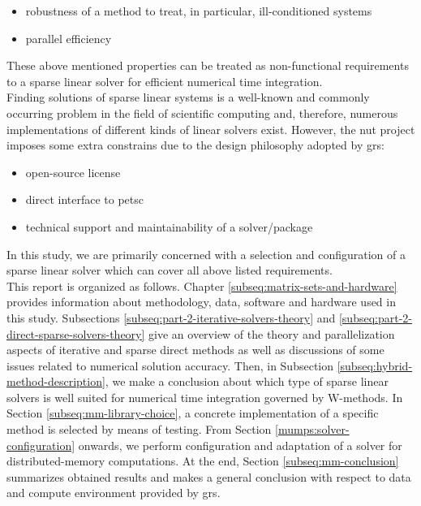 \begin{itemize}
	\item robustness of a method to treat, in particular, ill-conditioned systems
	\item parallel efficiency
\end{itemize}


These above mentioned properties can be treated as non-functional requirements to a sparse linear solver for efficient numerical time integration.\\

 
Finding solutions of sparse linear systems is a well-known and commonly occurring problem in the field of scientific computing and, therefore, numerous implementations of different kinds of linear solvers exist. However, the \acrshort{nut} project imposes some extra constrains due to the design philosophy adopted by \acrshort{grs}: \\


\begin{itemize}
	\item open-source license
	\item direct interface to \acrshort{petsc}
	\item technical support and maintainability of a solver/package
\end{itemize}



In this study, we are primarily concerned with a selection and configuration of a  sparse linear solver which can cover all above listed requirements.\\


This report is organized as follows. Chapter \ref{subseq:matrix-sets-and-hardware} provides information about methodology, data, software and hardware used in this study. Subsections \ref{subseq:part-2-iterative-solvers-theory} and \ref{subseq:part-2-direct-sparse-solvers-theory} give an overview of the theory and parallelization aspects of iterative and sparse direct methods as well as discussions of some issues related to numerical solution accuracy. Then, in Subsection \ref{subseq:hybrid-method-description}, we make a conclusion about which type of sparse linear solvers is well suited for numerical time integration governed by W-methods. In Section \ref{subseq:mm-library-choice}, a concrete implementation of a specific method is selected by means of testing. From Section \ref{mumps:solver-configuration} onwards, we perform configuration and adaptation of a solver for distributed-memory computations. At the end, Section \ref{subseq:mm-conclusion} summarizes obtained results and makes a general conclusion with respect to data and compute environment provided by  \acrshort{grs}.\\




